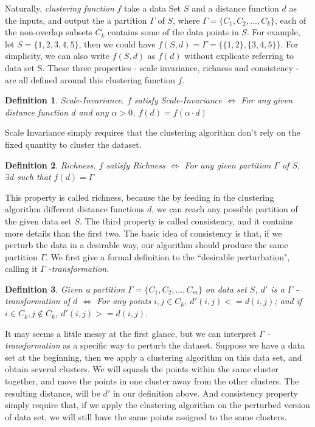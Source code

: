 \documentclass{uonmathreport}
\newtheorem{definition}{Definition}[section]
\begin{document}
Naturally, \textit{clustering function} $f$ take a data Set $S$ and a distance function $d$ as the inputs, and output the a partition $\Gamma$ of $S$, where $\Gamma = \{C_1,C_2,...,C_k\}$, each of the non-overlap subsets $C_k$ contains some of the data points in $S$. For example, let $S = \{1,2,3,4,5\}$, then we could have $f(S,d)= \Gamma = \{ \{1,2\},\{3,4,5\} \}$. For simplicity, we can also write $f(S,d)$ as $f(d)$ without explicate referring to data set S. These three properties - scale invariance, richness and consistency - are all defined around this clustering function $f$.

\begin{definition}
Scale-Invariance. $f$ satisfy Scale-Invariance $\iff$  For any given distance function $d$ and any $\alpha>0$, $f(d) = f(\alpha\cdot d)$
\end{definition}

Scale Invariance simply requires that the clustering algorithm don't rely on the fixed quantity to cluster the dataset.

\begin{definition}
Richness.  $f$ satisfy Richness $\iff$ For any given partition $\Gamma$ of $S$, $\exists d$ such that $f(d) =\Gamma$
\end{definition}

This property is called richness, because the by feeding in the clustering algorithm different distance functions $d$, we can reach any possible partition of the given data set $S$. The third property is called consistency, and it contains more details than the first two. The basic idea of consistency is that, if we perturb the data in a desirable way, our algorithm should produce the same partition $\Gamma$. We first give a formal definition to the ``desirable perturbation", calling it $\Gamma$ \textit{-transformation}.
\begin{definition}
Given a partition $\Gamma=\{C_1,C_2,...,C_m\}$ on data set $S$, 
$d'$ is a $\Gamma$ \textit{-transformation} of $d$ $\iff$ For any points $i,j\in C_k$, $d'(i,j)<=d(i,j)$; and if $i \in C_k, j\notin C_k$, $d'(i,j)>=d(i,j)$.
\end{definition}

It may seems a little messy at the first glance, but we can interpret $\Gamma$ \textit{-transformation} as a specific way to perturb the dataset. Suppose we have a data set at the beginning, then we apply a clustering algorithm on this data set, and obtain several clusters. We will squash the points within the same cluster together, and move the points in one cluster away from the other clusters. The resulting distance, will be $d'$ in our definition above. And consistency property simply require that, if we apply the clustering algorithm on the perturbed version of data set, we will still have the same points assigned to the same clusters.
\end{document}
